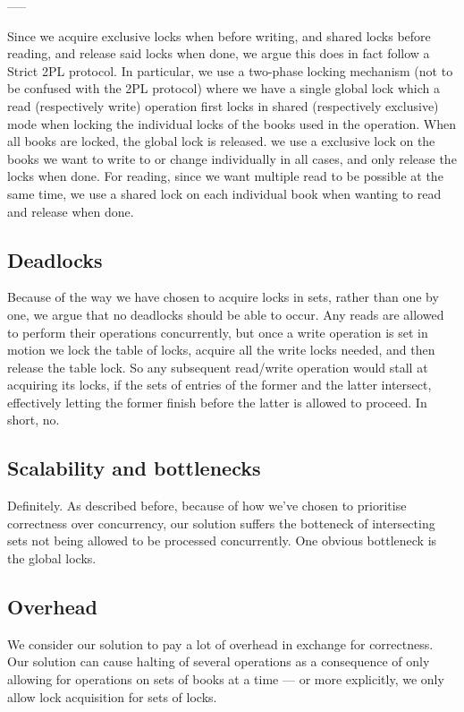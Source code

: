 -----

Since we acquire exclusive locks when before writing, and shared locks before reading, and release said locks when done, we argue this does in fact follow a Strict 2PL protocol. In particular, we use a two-phase locking mechanism (not to be confused with the 2PL protocol) where we have a single global lock which a read (respectively write) operation first locks in shared (respectively exclusive) mode when locking the individual locks of the books used in the operation. When all books are locked, the global lock is released. we use a exclusive lock on the books we want to write to or change individually in all cases, and only release the locks when done. For reading, since we want multiple read to be possible at the same time, we use a shared lock on each individual book when wanting to read and release when done.

\subsection{Deadlocks}
Because of the way we have chosen to acquire locks in sets, rather than one by
one, we argue that no deadlocks should be able to occur. Any reads are allowed
to perform their operations concurrently, but once a write operation is set in
motion we lock the table of locks, acquire all the write locks needed, and then
release the table lock. So any subsequent read/write operation would stall at
acquiring its locks, if the sets of entries of the former and the latter
intersect, effectively letting the former finish before the latter is allowed
to proceed. In short, no.

\subsection{Scalability and bottlenecks}
Definitely. As described before, because of how we've chosen to prioritise
correctness over concurrency, our solution suffers the botteneck of intersecting
sets not being allowed to be processed concurrently.
One obvious bottleneck is the global locks.

\subsection{Overhead}
We consider our solution to pay a lot of overhead in exchange for correctness.
Our solution can cause halting of several operations as a consequence of only
allowing for operations on sets of books at a time --- or more explicitly, we
only allow lock acquisition for sets of locks.

